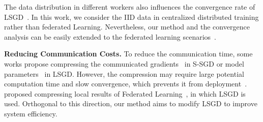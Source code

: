 

The data distribution in different workers also influences the convergence rate of LSGD~\cite{woodworth2020minibatch}. In this work, we consider the IID data in centralized distributed training rather than federated Learning. Nevertheless, our method and the convergence analysis can be easily extended to the federated learning scenarios~\cite{kairouz2021advances,VHL}.


\textbf{Reducing Communication Costs.}
To reduce the communication time, some works propose compressing the communicated gradients~\cite{10.1145/3452296.3472904,tang2020survey} in S-SGD or model parameters~\cite{10229032,10229086,GossipFL} in LSGD. However, the compression may require large potential computation time and slow convergence, which prevents it from deployment~\cite{agarwal2022utility}. ~\cite{10229032,10229086} proposed compressing local results of Federated Learning~\cite{VHL,GossipFL}, in which LSGD is used. Orthogonal to this direction, our method aims to modify LSGD to improve system efficiency.









\vspace{-0.1cm}
